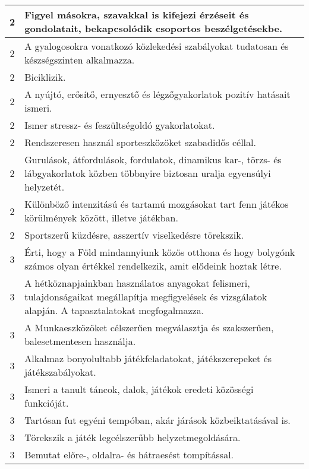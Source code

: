 \begin{longtable}{c | p{12cm} }
                                
                                          2 &  Figyel másokra, szavakkal is kifejezi érzéseit és gondolatait, bekapcsolódik csoportos beszélgetésekbe. \\ \hline
                                          2 &  A gyalogosokra vonatkozó közlekedési szabályokat tudatosan és készségszinten alkalmazza. \\ \hline
                                          2 &  Biciklizik. \\ \hline
                                          2 &  A nyújtó, erősítő, ernyesztő és légzőgyakorlatok pozitív hatásait ismeri. \\ \hline
                                          2 &  Ismer stressz- és feszültségoldó gyakorlatokat. \\ \hline
                                          2 &  Rendszeresen használ sporteszközöket szabadidős céllal. \\ \hline
                                          2 &  Gurulások, átfordulások, fordulatok, dinamikus kar-, törzs- és lábgyakorlatok közben többnyire biztosan uralja egyensúlyi helyzetét. \\ \hline
                                          2 &  Különböző intenzitású és tartamú mozgásokat tart fenn játékos körülmények között, illetve játékban. \\ \hline
                                          2 &  Sportszerű küzdésre, asszertív viselkedésre törekszik. \\ \hline
                                      
                                
                                          3 &  Érti, hogy a Föld mindannyiunk közös otthona és hogy bolygónk számos olyan értékkel rendelkezik, amit elődeink hoztak létre. \\ \hline
                                          3 &  A hétköznapjainkban használatos anyagokat felismeri, tulajdonságaikat megállapítja megfigyelések és vizsgálatok alapján. A tapasztalatokat megfogalmazza. \\ \hline
                                          3 &  A Munkaeszközöket célszerűen megválasztja és szakszerűen, balesetmentesen használja. \\ \hline
                                          3 &  Alkalmaz bonyolultabb játékfeladatokat, játékszerepeket és játékszabályokat. \\ \hline
                                          3 &  Ismeri a tanult táncok, dalok, játékok eredeti közösségi funkcióját. \\ \hline
                                          3 &  Tartósan fut egyéni tempóban, akár járások közbeiktatásával is. \\ \hline
                                          3 &  Törekszik a játék legcélszerűbb helyzetmegoldására. \\ \hline
                                          3 &  Bemutat előre-, oldalra- és hátraesést tompítással. \\ \hline
                                      

\end{longtable}
